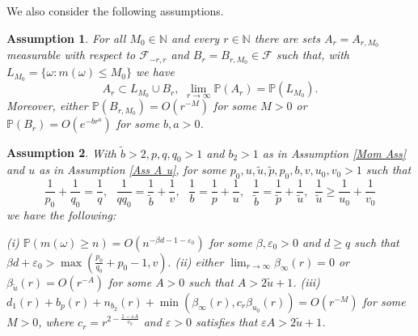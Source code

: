 \documentclass[11pt,reqno,a4paper]{article}
\newtheorem{assumption}{Assumption}
\theoremstyle{special}
\def\N{\mathbb{N}}
\begin{document}
We also consider the following assumptions.
\begin{assumption}\label{Inner aprpox}
 For all $M_0\in\N$  and every $r\in\N$  there are sets $A_r=A_{r,M_0}$ measurable with respect to  $\mathcal F_{-r,r}$ and $B_r=B_{r,M_0}\in\mathcal F$ such that, with $L_{M_0}=\{\omega: m(\omega)\leq M_0\}$ we have
$$
A_{r}\subset L_{M_0}\cup B_{r}, \,\,\lim_{r\to\infty}\mathbb P(A_r)=\mathbb P(L_{M_0}).
$$
Moreover, either $\mathbb P(B_{r,M_0})=O(r^{-M})$ for some $M>0$ or $\mathbb P(B_{r})=O(e^{-br^a})$ for some $b,a>0$.
\end{assumption}


\begin{assumption}\label{Poly Ass}
With $\tilde b>2, p,q,q_0>1$ and $b_2>1$ as in Assumption \ref{Mom Ass} and $u$ as in Assumption \ref{Ass A u}, for some $p_0, u,\tilde u, \tilde p, p_0, b,v, u_0,v_0>1$  such that 
$$
\frac1{p_0}+\frac{1}{q_0}=\frac{1}q,\,\,\,\, \frac{1}{qq_0}=\frac{1}{\tilde b}+\frac{1}v,\,\,\,\, \frac{1}b=\frac{1}{p}+\frac{1}{u},\,\,\,\, 
\frac{1}{\tilde b}=\frac{1}{\tilde p}+\frac{1}{\tilde u},\,\,\,\frac{1}{\tilde u}\geq \frac1{u_0}+\frac1{v_0}
$$
we have the following:


\vskip0.1cm
(i) $\mathbb P(m(\omega)\geq n)=O(n^{-\beta d-1-\varepsilon_0})$ for some $\beta,\varepsilon_0>0$ and $d\geq q$ such that
$
\beta d+\varepsilon_0>\max\left(\frac{p_0}{q_0}+p_0-1, v\right).
$
\vskip0.1cm
(ii)
either $\lim_{r\to\infty}\beta_\infty(r)=0$ or $\beta_{\tilde u}(r)=O(r^{-A})$ for some $A>0$ such that $A>2\tilde u+1$.
\vskip0.1cm
(iii) 
$
d_1(r)+b_{p}(r)+n_{b_2}(r)+\min(\beta_\infty(r),c_r\beta_{u_0}(r))=O(r^{-M})
$
for some $M>0$, where $c_r=r^{2-\frac{1-\varepsilon A}{v_0}}$
 and 
$\varepsilon>0$ satisfies that $\varepsilon A>2\tilde u+1$.     
\end{assumption}
\end{document}
